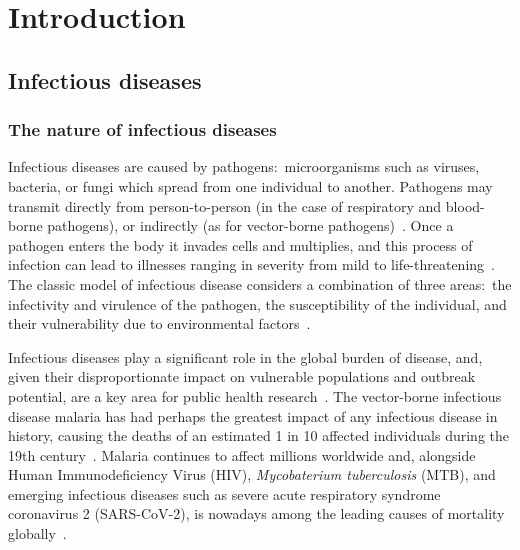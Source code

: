 
\chapter{Introduction}\label{cha:introduction}

\graphicspath{{01_Introduction/Figs/}}

\section{Infectious diseases}

\subsection{The nature of infectious diseases}

Infectious diseases are caused by pathogens:\ microorganisms such as viruses, bacteria, or fungi which spread from one individual to another. Pathogens may transmit directly from person-to-person (in the case of respiratory and blood-borne pathogens), or indirectly (as for vector-borne pathogens)~\parencite{Leung2021-wd}. Once a pathogen enters the body it invades cells and multiplies, and this process of infection can lead to illnesses ranging in severity from mild to life-threatening~\parencite{Alberts2002-zu}. The classic model of infectious disease considers a combination of three areas:\ the infectivity and virulence of the pathogen, the susceptibility of the individual, and their vulnerability due to environmental factors~\parencite{van-Seventer2017-rt}.

Infectious diseases play a significant role in the global burden of disease, and, given their disproportionate impact on vulnerable populations and outbreak potential, are a key area for public health research~\parencite{GBD-2019-Diseases-and-Injuries-Collaborators2020-gy}. The vector-borne infectious disease malaria has had perhaps the greatest impact of any infectious disease in history, causing the deaths of an estimated 1 in 10 affected individuals during the 19th century~\parencite{Carter2002-cu}. Malaria continues to affect millions worldwide and, alongside Human Immunodeficiency Virus (HIV), \textit{Mycobaterium tuberculosis} (MTB), and emerging infectious diseases such as severe acute respiratory syndrome coronavirus 2 (SARS-CoV-2), is nowadays among the leading causes of mortality globally~\parencite{van-Seventer2017-rt}.

